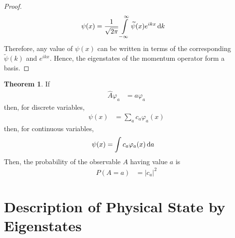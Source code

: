 \documentclass[titlepage, fleqn, a4paper, 12pt, twoside]{article}
\theoremstyle{definition}
\theoremstyle{theorem}
\newtheorem{theorem}{Theorem}
\renewcommand{\tilde}{\widetilde}
\begin{document}
\begin{proof}
	\begin{align*}
		\psi(x) &= \frac{1}{\sqrt{2 \pi}} \int\limits_{-\infty}^{\infty} \tilde{\psi}(x) e^{i k x} \dif k
	\end{align*}
	Therefore, any value of $\psi(x)$ can be written in terms of the corresponding $\tilde{\psi}(k)$ and $e^{i k x}$.
	Hence, the eigenstates of the momentum operator form a basis.
\end{proof}

\begin{theorem}
	If
	\begin{align*}
		\hat{A} \varphi_a &= a \varphi_a
	\end{align*}
	then, for discrete variables,
	\begin{align*}
		\psi(x) &= \sum\limits_{a} c_a \varphi_a(x)
	\end{align*}
	then, for continuous variables,
	\begin{align*}
		\psi(x) &= \int c_a \varphi_a(x) \dif a
	\end{align*}
	Then, the probability of the observable $A$ having value $a$ is
	\begin{align*}
		P(A = a) &= \left| c_a \right|^2
	\end{align*}
\end{theorem}

\section{Description of Physical State by Eigenstates}
\end{document}
